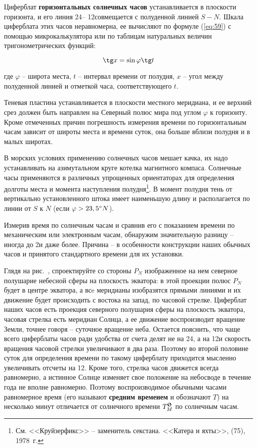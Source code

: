 Циферблат \textbf{горизонтальных солнечных часов} устанавливается в
плоскости горизонта, и его линия 24\thr \--- 12\thr совмещается с
полуденной линией $S-N$. Шкала циферблата этих часов неравномерна, ее
вычисляют по формуле (\ref{eq:59}) с помощью микрокалькулятора или по
таблицам натуральных величин тригонометрических функций:

\begin{equation}
  \tg x = \sin \varphi \tg t \label{eq:59}
\end{equation}

где $\varphi$ \--- широта места, $t$ \--- интервал времени от полудня,
$x$ \--- угол между полуденной линией и отметкой часа,
соответствующего $t$.

Теневая пластина устанавливается в плоскости местного меридиана, и ее
верхний срез должен быть направлен на Северный полюс мира под углом
$\varphi$ к горизонту. Кроме отмеченных причин погрешность измерения
времени по горизонтальным часам зависит от широты места и времени
суток, она больше вблизи полудня и в малых широтах.

В морских условиях применению солнечных часов мешает качка, их надо
устанавливать на азимутальном круге котелка магнитного
компаса. Солнечные часы применяются в различных упрощенных
ориентаторах для определения долготы места и момента наступления
полудня\footnote{См. <<Круйзерфикс>>\label{cruiserfix} \--- заменитель
  секстана. <<Катера и яхты>>,  (75), 1978~г.}. В момент полудня
тень от вертикально установленного штока имеет наименьшую длину и
располагается по линии от $S$ к $N$ (если $\varphi > 23,5^\circ N$).

Измерив время по солнечным часам и сравнив его с показанием времени по
механическим или электронным часам, обнаружим значительную разницу
\--- иногда до 2\thr и даже более. Причина \--- в особенности
конструкции наших обычных часов и принятого стандартного времени для
их установки.

Глядя на рис.~, спроектируйте со стороны $P_N$ изображенное на
нем северное полушарие небесной сферы на плоскость экватора: в этой
проекции полюс $P_N$ будет в центре экватора, а всe меридианы
изобразятся прямыми линиями и их движение будет происходить с востока
на запад, по часовой стрелке. Циферблат наших часов есть проекция
северного полушария сферы на плоскость экватора, часовая стрелка есть
меридиан Солнца, а ее движение воспроизводит вращение Земли, точнее
говоря \--- суточное вращение неба. Остается пояснить, что чаще всего
циферблаты часов ради удобства от счета делят не на 24\thr, а на
12\thr и скорость вращения часовой стрелки увеличивают в два
раза. Поэтому во второй половине суток для определения времени по
такому циферблату приходится мысленно увеличивать отсчеты на
12\thr. Кроме того, стрелка часов движется всегда равномерно, а
истинное Солнце изменяет свое положение на небосводе в течение года не
вполне равномерно. Поэтому воспроизводимое обычными часами равномерное
время (его называют \textbf{средним временем} и обозначают $T$) на
несколько минут отличается от солнечного времени $\TSun_M$ по
солнечным часам.

